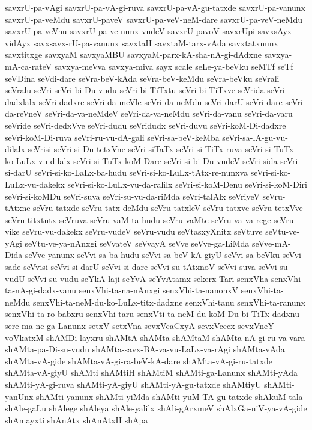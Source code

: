 {savxrU-pa-vAgi
savxrU-pa-vA-gi-ruva
savxrU-pa-vA-gu-tatxde
savxrU-pa-vanunx
savxrU-pa-veMdu
savxrU-paveV
savxrU-pa-veV-neM-dare
savxrU-pa-veV-neMdu
savxrU-pa-veVnu
savxrU-pa-ve-nunx-vudeV
savxrU-pavoV
savxrUpi
savxsAyx-vidAyx
savxsavx-rU-pa-vanunx
savxtaH
savxtaM-tarx-vAda
savxtatxnunx
savxtitxge
savxyaM
savxyaMBU
savxyaM-parx-kA-sha-nA-gi-dAdxne
savxya-mA-ca-rateV
savxya-meVva
savxya-miva
sayx
scale
seLe-ya-beVku
seMTf
seTf
seVDina
seVdi-dare
seVra-beV-kAda
seVra-beV-keMdu
seVra-beVku
seVrali
seVralu
seVri
seVri-bi-Du-vudu
seVri-bi-TiTxtu
seVri-bi-TiTxve
seVrida
seVri-dadxlalx
seVri-dadxre
seVri-da-meVle
seVri-da-neMdu
seVri-darU
seVri-dare
seVri-da-reVneV
seVri-da-va-neMdeV
seVri-da-va-neMdu
seVri-da-vanu
seVri-da-varu
seVride
seVri-dedxVve
seVri-dudu
seVridudx
seVri-duvu
seVri-koM-Di-dadxre
seVri-koM-Di-ruva
seVri-ru-vu-dA-gali
seVri-sa-beV-keMba
seVri-sa-lA-gu-vu-dilalx
seVrisi
seVri-si-Du-tetxVne
seVri-siTaTx
seVri-si-TiTx-ruva
seVri-si-TuTx-ko-LuLx-vu-dilalx
seVri-si-TuTx-koM-Dare
seVri-si-bi-Du-vudeV
seVri-sida
seVri-si-darU
seVri-si-ko-LaLx-ba-hudu
seVri-si-ko-LuLx-tAtx-re-nunxva
seVri-si-ko-LuLx-vu-dakekx
seVri-si-ko-LuLx-vu-da-ralilx
seVri-si-koM-Denu
seVri-si-koM-Diri
seVri-si-koMDu
seVri-suva
seVri-su-vu-da-riMda
seVri-talAlx
seVriyeV
seVru-tAtxne
seVru-tatxde
seVru-tatx-deMdu
seVru-tatxleV
seVru-tatxve
seVru-tetxVve
seVru-titxtutx
seVruva
seVru-vaM-ta-hudu
seVru-vaMte
seVru-va-va-rege
seVru-vike
seVru-vu-dakekx
seVru-vudeV
seVru-vudu
seVtasxyXnitx
seVtuve
seVtu-ve-yAgi
seVtu-ve-ya-nAnxgi
seVvateV
seVvayA
seVve
seVve-ga-LiMda
seVve-mA-Dida
seVve-yanunx
seVvi-sa-ba-hudu
seVvi-sa-beV-kA-giyU
seVvi-sa-beVku
seVvi-sade
seVvisi
seVvi-si-darU
seVvi-si-dare
seVvi-su-tAtxnoV
seVvi-suva
seVvi-su-vudU
seVvi-su-vudu
seYkA-laji
seYvA
seYvAtamx
sekerx-Tari
senxVha
senxVhi-ta-nA-gi-dadx-vanu
senxVhi-ta-na-nAnxgi
senxVhi-ta-nanonxV
senxVhi-ta-neMdu
senxVhi-ta-neM-du-ko-LuLx-titx-dadxne
senxVhi-tanu
senxVhi-ta-ranunx
senxVhi-ta-ro-babxru
senxVhi-taru
senxVti-ta-neM-du-koM-Du-bi-TiTx-dadxnu
sere-ma-ne-ga-Lanunx
setxV
setxVna
sevxVcaCxyA
sevxVcecx
sevxVneY-voVkatxM
shAMDi-layxru
shAMtA
shAMta
shAMtaM
shAMta-nA-gi-ru-va-vara
shAMta-pa-Di-su-vudu
shAMta-savx-BA-va-vu-LaLx-va-rAgi
shAMta-vAda
shAMta-vA-gide
shAMta-vA-gi-ra-beV-kA-dare
shAMta-vA-gi-ru-tatxde
shAMta-vA-giyU
shAMti
shAMtiH
shAMtiM
shAMti-ga-Lanunx
shAMti-yAda
shAMti-yA-gi-ruva
shAMti-yA-giyU
shAMti-yA-gu-tatxde
shAMtiyU
shAMti-yanUnx
shAMti-yanunx
shAMti-yiMda
shAMti-yuM-TA-gu-tatxde
shAkuM-tala
shAle-gaLu
shAlege
shAleya
shAle-yalilx
shAli-gArxmeV
shAlxGa-niV-ya-vA-gide
shAmayxti
shAnAtx
shAnAtxH
shApa
}
